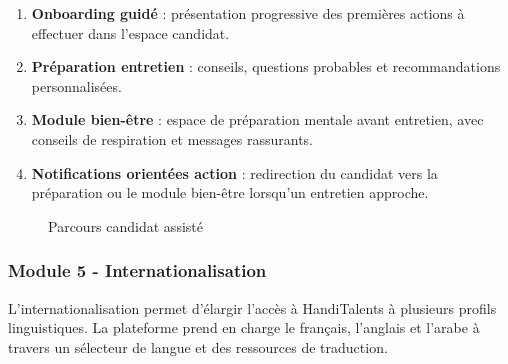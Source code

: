 \documentclass[12pt,a4paper]{report}
\begin{document}
\begin{enumerate}[label=\textbf{\Alph*.},font=\bfseries]
  \item \textbf{Onboarding guidé} : présentation progressive des premières actions à effectuer dans l'espace candidat.
  \item \textbf{Préparation entretien} : conseils, questions probables et recommandations personnalisées.
  \item \textbf{Module bien-être} : espace de préparation mentale avant entretien, avec conseils de respiration et messages rassurants.
  \item \textbf{Notifications orientées action} : redirection du candidat vers la préparation ou le module bien-être lorsqu'un entretien approche.
\end{enumerate}

\begin{figure}[H]
\centering
{}
\caption{Parcours candidat assisté}
\label{fig:parcours-candidat}
\end{figure}

\subsubsection{Module 5 - Internationalisation}

L'internationalisation permet d'élargir l'accès à HandiTalents à plusieurs profils linguistiques. La plateforme prend en charge le français, l'anglais et l'arabe à travers un sélecteur de langue et des ressources de traduction.
\end{document}
